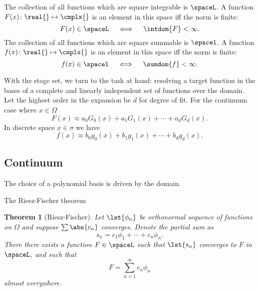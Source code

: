 The collection of all functions which are square integrable is $\spaceL$. A function $F(x)\colon \real{}  \mapsto \cmplx{}$ is an element in this space iff the norm is finite:
  \begin{equation}
    F(x) \in\spaceL \quad \iff \quad \intdom{F} < \infty.
    \label{eq:member:L}
  \end{equation}
The collection of all functions which are square summable is $\spacel$. A function $f(x)\colon \real{}  \mapsto \cmplx{}$ is an element in this space iff the norm is finite:
  \begin{equation}
    f(x) \in\spacel \quad \iff \quad \sumdom{f} < \infty.
    \label{eq:member:l}
  \end{equation}

With the stage set, we turn to the task at hand: resolving a target function in the bases of a complete and linearly independent set of functions over the domain. Let the highest order in the expansion be $d$ for degree of fit. For the continuum case where $x\in\Omega$
  \begin{equation}
    F(x) \approx a_{0}G_{0}(x) + a_{1}G_{1}(x) + \cdots + a_{d}G_{d}(x) .
    \label{eq:approx F}
  \end{equation}
In discrete space $x\in\sigma$ we have
  \begin{equation}
    f(x) \approx b_{0}g_{0}(x) + b_{1}g_{1}(x) + \cdots + b_{d}g_{d}(x) .
    \label{eq:approx G}
  \end{equation}

\subsection{\label{subsec:continuum}Continuum}
The choice of a polynomial basis is driven by the domain.

The Riesz-Fischer theorem\cite[p. 330]{Rudin}
\newtheorem{theorem}{Theorem}
\begin{theorem}[Riesz-Fischer]
Let $\lst{\phi_{n}}$ be orthonormal sequence of functions on $\Omega$ and suppose $\sum \abs{c_{n}}$ converges. Denote the partial sum as
  \begin{equation*}
    s_{n} = c_{1}\phi_{1} + \cdots + c_{n}\phi_{n} .
  \end{equation*}
There there exists a function $F\in\spaceL$ such that $\lst{s_{n}}$ converges to $F$ in $\spaceL$, and such that
  \begin{equation}
    F = \sum_{n=1}^{\infty} c_{n}\phi_{n}
  \end{equation}
almost everywhere.
\end{theorem}

\endinput %
